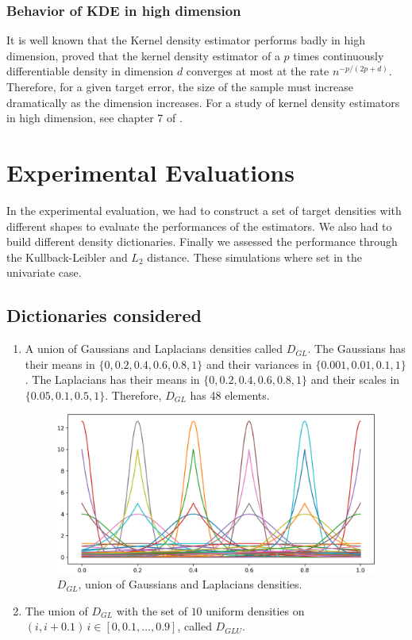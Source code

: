 \subsubsection{Behavior of KDE in high dimension}
It is well known that the Kernel density estimator performs badly in high dimension, \citep{stone1980} proved that the kernel density estimator of a $p$ times continuously differentiable density in dimension $d$ converges at most at the rate $n^{-p/(2p+d)}$. Therefore, for a given target error, the size of the sample must increase dramatically as the dimension increases. For a study of kernel density estimators in high dimension, see chapter 7 of \citep{scott_multivariate_2015}. 

\section{Experimental Evaluations}

In the experimental evaluation, we had to construct a set of target densities with different shapes to evaluate the performances of the estimators. We also had to build different density dictionaries. Finally we assessed the performance through the Kullback-Leibler and $L_2$ distance. These simulations where set in the univariate case.

\subsection{Dictionaries considered}
\begin{enumerate}
\item A union of Gaussians and Laplacians densities called $D_{GL}$. The Gaussians has their means in $\{0, 0.2, 0.4, 0.6, 0.8, 1\}$ and their variances in $\{0.001, 0.01, 0.1, 1\}$. The Laplacians has their means in $\{0, 0.2, 0.4, 0.6, 0.8, 1\}$ and their scales in $\{0.05, 0.1, 0.5, 1\}$. Therefore, $D_{GL}$ has 48 elements.

\begin{figure}[h]
\centering
\includegraphics[width=1\textwidth]{TeX_files/lapl_gauss_dict.png}
\caption{$D_{GL}$, union of Gaussians and Laplacians densities.}
\end{figure}
\item The union of $D_{GL}$ with the set of $10$ uniform densities on $(i, i+0.1)\, i\in [0, 0.1,\dots,0.9]$, called $D_{GLU}$.
\end{enumerate}


